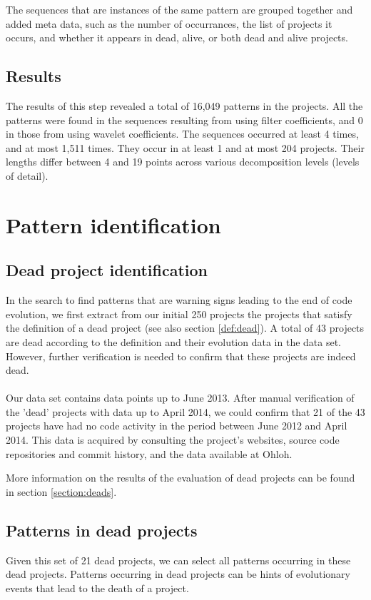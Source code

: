 The sequences that are instances of the same pattern are grouped together and
added meta data, such as the number of occurrances, the list of projects
it occurs, and whether it appears in dead, alive, or both dead and alive
projects.

\subsection{Results}
The results of this step revealed a total of 16,049 patterns in the projects.
All the patterns were found in the sequences resulting from using filter
coefficients, and 0 in those from using wavelet coefficients. The sequences
occurred at least 4 times, and at most 1,511 times. They occur in at least 1
and at most 204 projects. Their lengths differ between 4 and 19 points across
various decomposition levels (levels of detail).

\section{Pattern identification}
\subsection{Dead project identification}
In the search to find patterns that are warning signs leading to the end of
code evolution, we first extract from our initial 250 projects the projects
that satisfy the definition of a dead project (see also section \ref{def:dead}).
A total of 43 projects are dead according to the definition and their evolution
data in the data set. However, further verification is needed to confirm that
these projects are indeed dead.

\paragraph{}
Our data set contains data points up to June 2013. After manual verification of
the 'dead' projects with data up to April 2014, we could confirm that 21 of the
43 projects have had no code activity in the period between June 2012 and
April 2014. This data is acquired by consulting the project's websites, source
code repositories and commit history, and the data available at Ohloh.

More information on the results of the evaluation of dead projects can be found
in section \ref{section:deads}.

\subsection{Patterns in dead projects}
Given this set of 21 dead projects, we can select all patterns occurring in
these dead projects. Patterns occurring in dead projects can be hints of
evolutionary events that lead to the death of a project.

